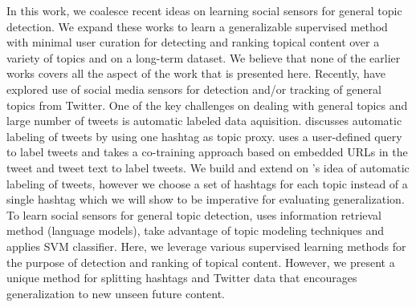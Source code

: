 In this work, we coalesce recent ideas on learning social sensors for general topic detection. We expand these works to learn a generalizable supervised method with minimal user curation for detecting and ranking topical content over a variety of topics and on a long-term dataset. We believe that none of the earlier works covers all the aspect of the work that is presented here. 
Recently, \citep{lin2011smoothing,yang2014large,magdy} have explored use of social media sensors for detection and/or tracking of general topics from Twitter. One of the key challenges on dealing with general topics and large number of tweets is automatic labeled data aquisition. \cite{lin2011smoothing} discusses automatic labeling of tweets by using one hashtag as topic proxy. \cite{magdy} uses a user-defined query to label tweets and \cite{yang2014large} takes a co-training approach based on embedded URLs in the tweet and tweet text to label tweets. We build and extend on \citep{lin2011smoothing}'s idea of automatic labeling of tweets, however we choose a set of hashtags for each topic instead of a single hashtag which we will show to be imperative for evaluating generalization. To learn social sensors for general topic detection, \citep{lin2011smoothing} uses information retrieval method (language models), \cite{yang2014large} take advantage of topic modeling techniques and \cite{magdy} applies SVM classifier. Here, we leverage various supervised learning methods for the purpose of detection and ranking of topical content. However, we present a unique method for splitting hashtags and Twitter data that encourages generalization to new unseen future content. 
